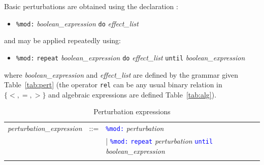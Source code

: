 \documentclass[11pt]{book}
\def\tcb#1{\textcolor{blue}{\ttt{#1}}}
\def\ttt#1{\texttt{#1}}
\def\set#1{\{#1\}}
\def\ITE#1{\begin{itemize}#1\end{itemize}}
\begin{document}
Basic perturbations are obtained using the declaration :
\ITE{
\item[] \ttt{\%mod:} \textit{boolean\_expression} \ttt{do} \textit{effect\_list} 
}
and may be applied repeatedly using:
\ITE{
\item[] \ttt{\%mod:} \ttt{repeat} \textit{boolean\_expression} \ttt{do} \textit{effect\_list} \ttt{until} \textit{boolean\_expression} 
}
where \textit{boolean\_expression} and \textit{effect\_list} are defined by the grammar given  Table~\ref{tab:pert} (the operator \ttt{rel} can be any usual binary relation in $\set{<,=,>}$ and algebraic expressions are defined Table~\ref{tab:alg}).

\begin{table}[htbp]
  \centering
  \caption{Perturbation expressions}
  \begin{tabular}{@{} lcl @{}}
  	\textit{perturbation\_expression} &::=& \tcb{\ttt{\%mod:}} \textit{perturbation} \\
	&& | \tcb{\ttt{\%mod:}} \tcb{\ttt{repeat}} \textit{perturbation} \tcb{\ttt{until}} \textit{boolean\_expression} \\\\ 
    

\end{tabular}
\end{table}
\end{document}
